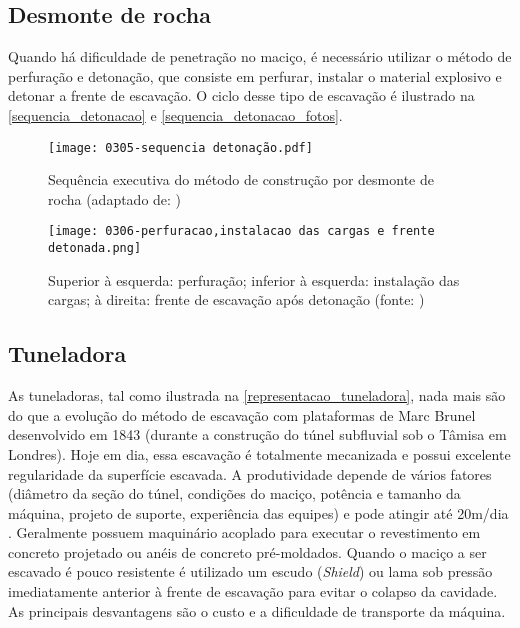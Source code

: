 \subsection{Desmonte de rocha}

Quando há dificuldade de penetração no maciço, é necessário utilizar o método de perfuração e detonação, que consiste em perfurar, instalar o material explosivo e detonar a frente de escavação. O ciclo desse tipo de escavação é ilustrado na \autoref{sequencia_detonacao} e \autoref{sequencia_detonacao_fotos}.

\begin{figure}[H]
	\begin{center}
		\texttt{[image: 0305-sequencia detonação.pdf]}
	\end{center}
	\caption{\label{sequencia_detonacao}Sequência executiva do método de construção por desmonte de rocha (adaptado de: )}
\end{figure}

\begin{figure}[H]
	\begin{center}
		\texttt{[image: 0306-perfuracao,instalacao das cargas e frente detonada.png]}
	\end{center}
	\caption{\label{sequencia_detonacao_fotos}Superior à esquerda: perfuração; inferior à esquerda: instalação das cargas; à direita: frente de escavação após detonação (fonte: )}
\end{figure}

\subsection{Tuneladora}

As tuneladoras, tal como ilustrada na \autoref{representacao_tuneladora}, nada mais são do que a evolução do método de escavação com plataformas de Marc Brunel desenvolvido em 1843 (durante a construção do túnel subfluvial sob o Tâmisa em Londres). Hoje em dia, essa escavação é totalmente mecanizada e possui excelente regularidade da superfície escavada. A produtividade depende de vários fatores (diâmetro da seção do túnel, condições do maciço, potência e tamanho da máquina, projeto de suporte, experiência das equipes) e pode atingir até 20m/dia \cite[p. 98]{Brox2017}. Geralmente possuem maquinário acoplado para executar o revestimento em concreto projetado ou anéis de concreto pré-moldados. Quando o maciço a ser escavado é pouco resistente é utilizado um escudo (\textit{Shield}) ou lama sob pressão imediatamente anterior à frente de escavação para evitar o colapso da cavidade. As principais desvantagens são o custo e a dificuldade de transporte da máquina.

